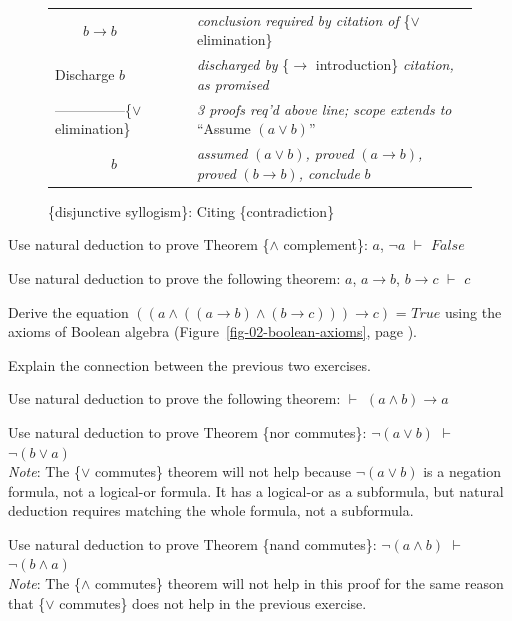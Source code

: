 {{\begin{figure}
\begin{center}
\begin{tabular}{ll}
~~~~$b \rightarrow b$ &\emph{conclusion required by citation of} \{$\vee$ elimination\}\\
Discharge $b$              & \emph{discharged by} \{$\rightarrow$ introduction\} \emph{citation, as promised}\\
---------------\{$\vee$ elimination\}       &\emph{3 proofs req'd above line; scope extends to} ``Assume $(a \vee b)$''\\
~~~~~~~~$b$        &\emph{assumed} $(a \vee b)$\emph{, proved} $(a \rightarrow b)$\emph{, proved} $(b \rightarrow b)$\emph{, conclude }$b$\\
\end{tabular}
\end{center}
\caption{\{disjunctive syllogism\}: Citing \{contradiction\}}
\label{fig:disjunctive-syllogism-nd}
\end{figure}

\begin{ExerciseList}
\Exercise
Use natural deduction to prove
Theorem \{$\wedge$ complement\}: $a$, $\neg a$ $\vdash$ $False$

\Exercise
Use natural deduction to prove the following theorem:
$a$, $a \rightarrow b$, $b \rightarrow c$ $\vdash$ $c$

\Exercise
Derive the equation
$((a \wedge ((a \rightarrow b) \wedge (b \rightarrow c))) \rightarrow c)$ = $True$
using the axioms of Boolean algebra
(Figure~\ref{fig-02-boolean-axioms}, page \pageref{fig-02-boolean-axioms}).

\Exercise
Explain the connection between the previous two exercises.

\Exercise
Use natural deduction to prove the following theorem:
$\vdash$ $(a \wedge b) \rightarrow a$

\Exercise
Use natural deduction to prove
Theorem \{nor commutes\}: $\neg (a \vee b)$ $\vdash$ $\neg (b \vee a)$\\
\emph{Note}: The \{$\vee$ commutes\} theorem will not help because
$\neg (a \vee b)$ is a negation formula, not a logical-or formula.
It has a logical-or as a subformula, but natural deduction
requires matching the whole formula, not a subformula.

\Exercise
Use natural deduction to prove
Theorem \{nand commutes\}: $\neg (a \wedge b)$ $\vdash$ $\neg (b \wedge a)$\\
\emph{Note}: The \{$\wedge$ commutes\} theorem will not help in this proof
for the same reason that \{$\vee$ commutes\} does not help
in the previous exercise.


\end{ExerciseList}}}
